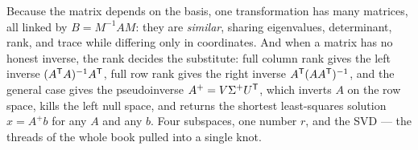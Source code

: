Because the matrix depends on the basis, one transformation has many matrices, all linked by $B=M^{-1}AM$: they are \emph{similar}, sharing eigenvalues, determinant, rank, and trace while differing only in coordinates. And when a matrix has no honest inverse, the rank decides the substitute: full column rank gives the left inverse $(A^{\mathsf T} A)^{-1}A^{\mathsf T}$, full row rank gives the right inverse $A^{\mathsf T}(AA^{\mathsf T})^{-1}$, and the general case gives the pseudoinverse $A^{+}=V\Sigma^{+}U^{\mathsf T}$, which inverts $A$ on the row space, kills the left null space, and returns the shortest least-squares solution $\hat x=A^{+}b$ for any $A$ and any $b$. Four subspaces, one number $r$, and the SVD --- the threads of the whole book pulled into a single knot.
